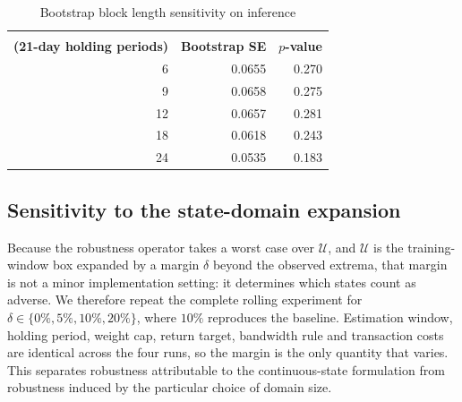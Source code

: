 \documentclass[smallcondensed]{svjour3}
\begin{document}
\begin{table}[!htbp]
\centering
\caption{Bootstrap block length sensitivity on inference}
\label{tab:sens_block}
\begin{tabular}{rrr}
\toprule
\makecell[r]{\textbf{Block length $b$}\\\textbf{(21-day holding periods)}} & \textbf{Bootstrap SE} & \textbf{$p$-value} \\
\midrule
6 & 0.0655 & 0.270 \\
9 & 0.0658 & 0.275 \\
12 & 0.0657 & 0.281 \\
18 & 0.0618 & 0.243 \\
24 & 0.0535 & 0.183 \\
\bottomrule
\end{tabular}
\end{table}


\subsection{Sensitivity to the state-domain expansion}
\label{sec:margin}
Because the robustness operator takes a worst case over $\mathcal{U}$, and
$\mathcal{U}$ is the training-window box expanded by a margin $\delta$ beyond the
observed extrema, that margin is not a minor implementation setting: it
determines which states count as adverse. We therefore repeat the complete
rolling experiment for $\delta \in \{0\%, 5\%, 10\%, 20\%\}$, where $10\%$
reproduces the baseline. Estimation window, holding period, weight cap, return
target, bandwidth rule and transaction costs are identical across the four runs,
so the margin is the only quantity that varies. This separates robustness
attributable to the continuous-state formulation from robustness induced by the
particular choice of domain size.
\end{document}

